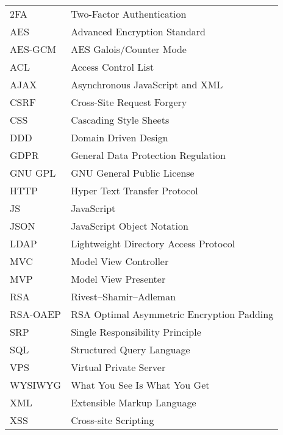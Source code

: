 
\seznamzkr

\begin{tabular}{ll}
2FA 		& Two-Factor Authentication \\
AES 		& Advanced Encryption Standard \\
AES-GCM 	& AES Galois/Counter Mode \\
ACL 		& Access Control List \\
AJAX 	& Asynchronous JavaScript and XML \\
CSRF 	& Cross-Site Request Forgery \\
CSS		& Cascading Style Sheets \\
DDD 		& Domain Driven Design \\
GDPR		& General Data Protection Regulation \\
GNU GPL	& GNU General Public License \\
HTTP 	& Hyper Text Transfer Protocol \\
JS		& JavaScript \\
JSON		& JavaScript Object Notation \\
LDAP		& Lightweight Directory Access Protocol \\
MVC 		& Model View Controller \\
MVP 		& Model View Presenter \\
RSA		& Rivest–Shamir–Adleman \\
RSA-OAEP	& RSA Optimal Asymmetric Encryption Padding \\
SRP 		& Single Responsibility Principle \\
SQL		& Structured Query Language \\
VPS		& Virtual Private Server \\
WYSIWYG 	& What You See Is What You Get \\
XML 		& Extensible Markup Language \\
XSS 		& Cross-site Scripting \\
\end{tabular}

